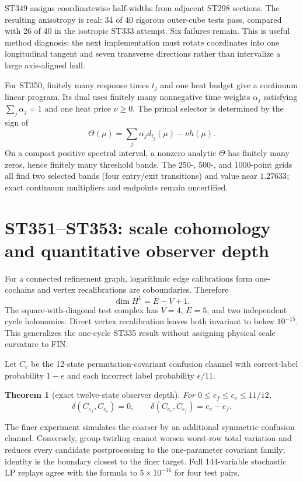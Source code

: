 \documentclass[11pt,a4paper]{article}
\newtheorem{theorem}{Theorem}[section]
\begin{document}
ST349 assigns coordinatewise half-widths from adjacent ST298 sections. The resulting
anisotropy is real: 34 of 40 rigorous outer-cube tests pass, compared with 26 of 40 in the
isotropic ST333 attempt. Six failures remain. This is useful method diagnosis: the next
implementation must rotate coordinates into one longitudinal tangent and seven transverse
directions rather than intervalize a large axis-aligned hull.

For ST350, finitely many response times $t_j$ and one heat budget give a continuum linear
program. Its dual uses finitely many nonnegative time weights $\alpha_j$ satisfying
$\sum_j\alpha_j=1$ and one heat price $\nu\ge0$. The primal selector is determined by the
sign of
\[
\Theta(\mu)=\sum_j\alpha_j d_{t_j}(\mu)-\nu h(\mu).
\]
On a compact positive spectral interval, a nonzero analytic $\Theta$ has finitely many
zeros, hence finitely many threshold bands. The 250-, 500-, and 1000-point grids all find
two selected bands (four entry/exit transitions) and value near $1.27633$; exact continuum multipliers and endpoints remain
uncertified.

\section{ST351--ST353: scale cohomology and quantitative observer depth}

For a connected refinement graph, logarithmic edge calibrations form one-cochains and
vertex recalibrations are coboundaries. Therefore
\[
\dim H^1=E-V+1.
\]
The square-with-diagonal test complex has $V=4$, $E=5$, and two independent cycle
holonomies. Direct vertex recalibration leaves both invariant to below $10^{-15}$. This
generalizes the one-cycle ST335 result without assigning physical scale curvature to FIN.

Let $C_e$ be the 12-state permutation-covariant confusion channel with correct-label
probability $1-e$ and each incorrect label probability $e/11$.
\begin{theorem}[exact twelve-state observer depth]
For $0\le e_f\le e_c\le11/12$,
\[
\delta(C_{e_f},C_{e_c})=0,
\qquad
\delta(C_{e_c},C_{e_f})=e_c-e_f.
\]
\end{theorem}
The finer experiment simulates the coarser by an additional symmetric confusion channel.
Conversely, group-twirling cannot worsen worst-row total variation and reduces every
candidate postprocessing to the one-parameter covariant family; identity is the boundary
closest to the finer target. Full 144-variable stochastic LP replays agree with the formula
to $5\times10^{-16}$ for four test pairs.
\end{document}
